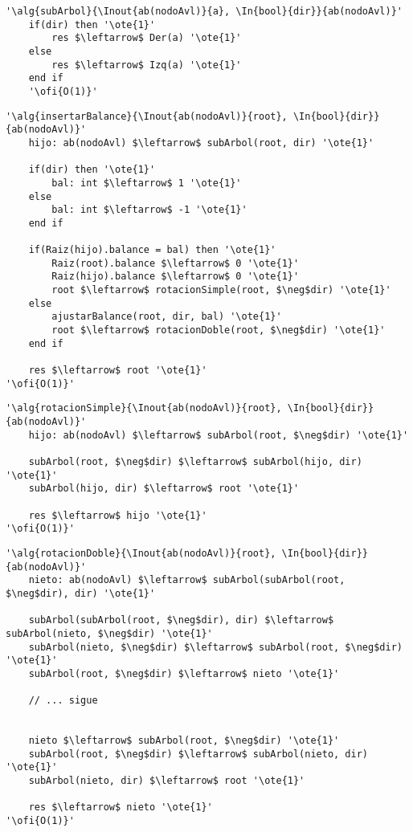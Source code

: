 \begin{lstlisting}[mathescape]
'\alg{subArbol}{\Inout{ab(nodoAvl)}{a}, \In{bool}{dir}}{ab(nodoAvl)}'
	if(dir) then '\ote{1}'
		res $\leftarrow$ Der(a) '\ote{1}'
	else
		res $\leftarrow$ Izq(a) '\ote{1}'
	end if
	'\ofi{O(1)}'
\end{lstlisting}

\begin{lstlisting}[mathescape]
'\alg{insertarBalance}{\Inout{ab(nodoAvl)}{root}, \In{bool}{dir}}{ab(nodoAvl)}'
	hijo: ab(nodoAvl) $\leftarrow$ subArbol(root, dir) '\ote{1}'

	if(dir) then '\ote{1}'
		bal: int $\leftarrow$ 1 '\ote{1}'
	else
		bal: int $\leftarrow$ -1 '\ote{1}'
	end if

	if(Raiz(hijo).balance = bal) then '\ote{1}'
		Raiz(root).balance $\leftarrow$ 0 '\ote{1}'
		Raiz(hijo).balance $\leftarrow$ 0 '\ote{1}'
		root $\leftarrow$ rotacionSimple(root, $\neg$dir) '\ote{1}'
	else
		ajustarBalance(root, dir, bal) '\ote{1}'
		root $\leftarrow$ rotacionDoble(root, $\neg$dir) '\ote{1}'
	end if

	res $\leftarrow$ root '\ote{1}'
'\ofi{O(1)}'
\end{lstlisting}

\begin{lstlisting}[mathescape]
'\alg{rotacionSimple}{\Inout{ab(nodoAvl)}{root}, \In{bool}{dir}}{ab(nodoAvl)}'
	hijo: ab(nodoAvl) $\leftarrow$ subArbol(root, $\neg$dir) '\ote{1}'

	subArbol(root, $\neg$dir) $\leftarrow$ subArbol(hijo, dir) '\ote{1}'
	subArbol(hijo, dir) $\leftarrow$ root '\ote{1}'

	res $\leftarrow$ hijo '\ote{1}'
'\ofi{O(1)}'
\end{lstlisting}

\begin{lstlisting}[mathescape]
'\alg{rotacionDoble}{\Inout{ab(nodoAvl)}{root}, \In{bool}{dir}}{ab(nodoAvl)}'
	nieto: ab(nodoAvl) $\leftarrow$ subArbol(subArbol(root, $\neg$dir), dir) '\ote{1}'

	subArbol(subArbol(root, $\neg$dir), dir) $\leftarrow$ subArbol(nieto, $\neg$dir) '\ote{1}'
	subArbol(nieto, $\neg$dir) $\leftarrow$ subArbol(root, $\neg$dir) '\ote{1}'
	subArbol(root, $\neg$dir) $\leftarrow$ nieto '\ote{1}'

	// ... sigue


	nieto $\leftarrow$ subArbol(root, $\neg$dir) '\ote{1}'
	subArbol(root, $\neg$dir) $\leftarrow$ subArbol(nieto, dir) '\ote{1}'
	subArbol(nieto, dir) $\leftarrow$ root '\ote{1}'

	res $\leftarrow$ nieto '\ote{1}'
'\ofi{O(1)}'
\end{lstlisting}

